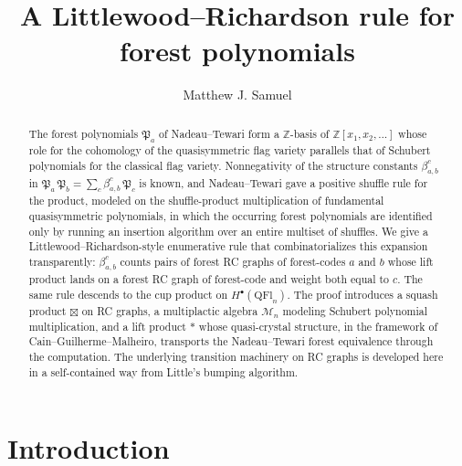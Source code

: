 \documentclass{amsart}
\title{A Littlewood--Richardson rule for forest polynomials}
\author{Matthew J. Samuel}
\theoremstyle{definition}
\theoremstyle{remark}
\numberwithin{equation}{subsection}
\newcommand{\forest}{\mathfrak{P}}
\begin{document}
\begin{abstract}
The forest polynomials $\forest_a$ of Nadeau--Tewari form a $\mathbb{Z}$-basis of $\mathbb{Z}[x_1,x_2,\ldots]$ whose role for the cohomology of the quasisymmetric flag variety parallels that of Schubert polynomials for the classical flag variety. Nonnegativity of the structure constants $\beta_{a,b}^c$ in $\forest_a\,\forest_b = \sum_c \beta_{a,b}^c\,\forest_c$ is known, and Nadeau--Tewari gave a positive shuffle rule for the product, modeled on the shuffle-product multiplication of fundamental quasisymmetric polynomials, in which the occurring forest polynomials are identified only by running an insertion algorithm over an entire multiset of shuffles. We give a Littlewood--Richardson-style enumerative rule that combinatorializes this expansion transparently: $\beta_{a,b}^c$ counts pairs of forest RC graphs of forest-codes $a$ and $b$ whose lift product lands on a forest RC graph of forest-code and weight both equal to $c$. The same rule descends to the cup product on $H^\bullet(\mathrm{QFl}_n)$. The proof introduces a squash product $\boxtimes$ on RC graphs, a multiplactic algebra $\mathcal{M}_n$ modeling Schubert polynomial multiplication, and a lift product $*$ whose quasi-crystal structure, in the framework of Cain--Guilherme--Malheiro, transports the Nadeau--Tewari forest equivalence through the computation. The underlying transition machinery on RC graphs is developed here in a self-contained way from Little's bumping algorithm.
\end{abstract}

	\maketitle

\section{Introduction}
\end{document}
